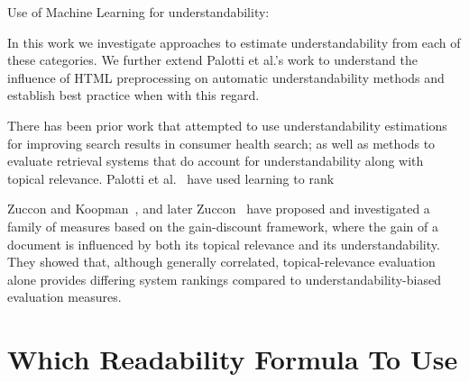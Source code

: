 Use of Machine Learning for understandability: 

In this work we investigate approaches to estimate understandability from each of these categories. We further extend Palotti et al.'s work to understand the influence of HTML preprocessing on automatic understandability methods and establish best practice when with this regard. 

There has been prior work that attempted to use understandability estimations for improving search results in consumer health search; as well as methods to evaluate retrieval systems that do account for understandability along with topical relevance. Palotti et al.~\cite{palotti2016ranking} have used learning to rank 

\cite{soldaini2017learning}

Zuccon and Koopman~\cite{zuccon14}, and later Zuccon~\cite{zuccon2016understandability} have proposed and investigated a family of measures based on the gain-discount framework, where the gain of a document is influenced by both its topical relevance and its understandability. They showed that, although generally correlated, topical-relevance evaluation alone provides differing system rankings compared to understandability-biased evaluation measures. 


\section{Which Readability Formula To Use}
\label{sec:which_readability}


